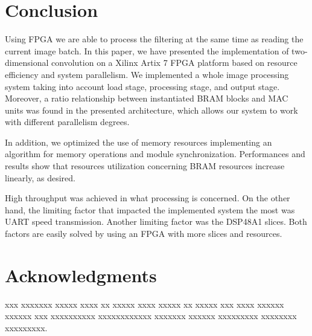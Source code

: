 \documentclass[conference,compsoc]{IEEEtran}
\begin{document}




\section{Conclusion}\label{sec:conclusion}
Using FPGA we are able to process the filtering at the same time as reading the
current image batch. In this paper, we have presented the implementation of
two-dimensional convolution on a Xilinx Artix 7 FPGA platform based on resource
efficiency and system parallelism. We implemented a whole image processing
system taking into account load stage, processing stage, and output stage.
Moreover, a ratio relationship between instantiated BRAM blocks and MAC units was
found in the presented architecture, which allows our system to work with different
parallelism degrees.

In addition, we optimized the use of memory resources implementing an algorithm
for memory operations and module synchronization. Performances and results show that resources utilization
concerning BRAM resources increase linearly, as desired.

High throughput was achieved in what processing is concerned. On the other hand,
the limiting factor that impacted the implemented system the most was UART speed
transmission. Another limiting factor was the DSP48A1 slices. Both factors
are easily solved by using an FPGA with more slices and
resources.






\ifCLASSOPTIONcompsoc
  \section*{Acknowledgments}
xxx xxxxxxx xxxxx xxxx xx xxxxx xxxx xxxxx xx xxxxx xxx xxxx xxxxxx xxxxxx xxx
xxxxxxxxxx xxxxxxxxxxxx xxxxxxx xxxxxx xxxxxxxxx xxxxxxxx xxxxxxxxx.
\end{document}
